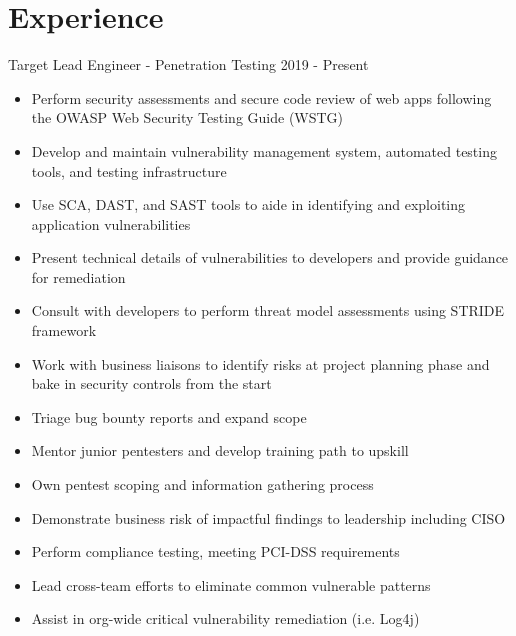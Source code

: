 \documentclass[a4paper]{twentysecondcv} %
\begin{document}
\makeprofile %

\section{Experience}

\begin{twenty} %
    \twentyitem
        {Target}
        {}
        {Lead Engineer - Penetration Testing}
        {2019 - Present}
        {}
        {}        
\end{twenty}

{\vspace{-5mm}}



\begin{itemize}[leftmargin=8mm]
\baselineskip
    \item Perform security assessments and secure code review of web apps following the OWASP Web Security Testing Guide (WSTG)
    \item Develop and maintain vulnerability management system, automated testing tools, and testing infrastructure
    \item Use SCA, DAST, and SAST tools to aide in identifying and exploiting application vulnerabilities
    \item Present technical details of vulnerabilities to developers and provide guidance for remediation
    \item Consult with developers to perform threat model assessments using STRIDE framework
    \item Work with business liaisons to identify risks at project planning phase and bake in security controls from the start
    \item Triage bug bounty reports and expand scope    
    \item Mentor junior pentesters and develop training path to upskill
    \item Own pentest scoping and information gathering process
    \item Demonstrate business risk of impactful findings to leadership including CISO
    \item Perform compliance testing, meeting PCI-DSS requirements
    \item Lead cross-team efforts to eliminate common vulnerable patterns
    \item Assist in org-wide critical vulnerability remediation (i.e. Log4j)
    \end{itemize}
\end{document}
